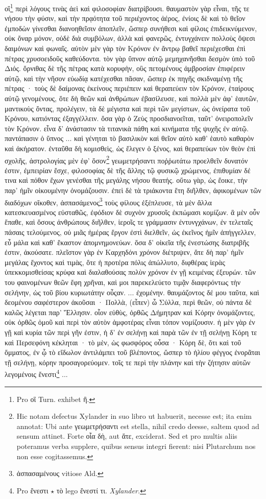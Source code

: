 \documentclass[a4paper, 11pt, oneside, polutonikogreek, german]{article}
\begin{document}
οἳ\footnote{Pro οἳ Turn. exhibet ἢ.} περὶ λόγους τινὰς ἀεὶ καὶ φιλοσοφίαν διατρίβουσι. θαυμαστὸν γὰρ εἶναι, τῆς τε νήσου τὴν φύσιν, καὶ τὴν πρᾳότητα τοῦ περιέχοντος ἀέρος, ἐνίοις δὲ καὶ τὸ θεῖον ἐμποδὼν γίνεσθαι διανοηθεῖσιν ἀποπλεῖν, ὥσπερ συνήθεσι καὶ φίλοις ἐπιδεικνύμενον, οὐκ ὄναρ μόνον, οὐδὲ διὰ συμβόλων, ἀλλὰ καὶ φανερῶς, ἐντυγχάνειν πολλοὺς ὄψεσι δαιμόνων καὶ φωναῖς. αὐτὸν μὲν γὰρ τὸν Κρόνον ἐν ἄντρῳ βαθεῖ περιέχεσθαι ἐπὶ πέτρας χρυσοειδοῦς καθεύδοντα. τὸν γὰρ ὕπνον αὐτῷ μεμηχανῆσθαι δεσμὸν ὑπὸ τοῦ Διός. ὄρνιθας δὲ τῆς πέτρας κατὰ κορυφὴν, οὓς πετομένους ἀμβροσίαν ἐπιφέρειν αὐτῷ, καὶ τὴν νῆσον εὐωδίᾳ κατέχεσθαι πᾶσαν, ὥσπερ ἐκ πηγῆς σκιδναμένῃ τῆς πέτρας · τοὺς δὲ δαίμονας ἐκείνους περιέπειν καὶ θεραπεύειν τὸν Κρόνον, ἑταίρους αὐτῷ γενομένους, ὅτε δὴ θεῶν καὶ ἀνθρώπων ἐβασίλευσε, καὶ πολλὰ μὲν ἀφ' ἑαυτῶν, μαντικοὺς ὄντας, προλέγειν, τὰ δὲ μέγιστα καὶ περὶ τῶν μεγίστων, ὡς ὀνείρατα τοῦ Κρόνου, κατιόντας ἐξαγγέλλειν. ὅσα γὰρ ὁ Ζεὺς προσδιανοεῖται, ταῦτ' ὀνειροπολεῖν τὸν Κρόνον. εἶνα δ' ἀνάστασιν τὰ τιτανικὰ πάθη καὶ κινήματα τῆς ψυχῆς ἐν αὐτῷ. παντάπασιν ὁ ὕπνος ... καὶ γένηται τὸ βασιλικὸν καὶ θεῖον αὐτὸ καθ' ἑαυτὸ καθαρὸν καὶ ἀκήρατον. ἐνταῦθα δὴ κομισθεὶς, ὡς ἔλεγεν ὁ ξένος, καὶ θεραπεύων τὸν θεὸν ἐπὶ σχολῆς, ἀστρολογίας μὲν ἐφ' ὅσον\footnote{Hic notam defectus Xylander in suo libro ut habuerit, necesse est; ita enim annotat: Ubi ante γεωμετρήσαντι est stella, nihil credo deesse, saltem quod ad sensum attinet. Forte οἷα δὴ, aut ἅτε, exciderat. Sed et pro multis aliis poteramus verba supplere, quibus sensus integri fierent: nisi Plutarchum nos non esse cogitassemus.} γεωμετρήσαντι ποῤῥωτάτω προελθεῖν δυνατόν ἐστιν, ἐμπειρίαν ἔσχε, φιλοσοφίας δὲ τῆς ἄλλης τῷ φυσικῷ χρώμενος, ἐπιθυμίαν δέ τινα καὶ πόθον ἔχων γενέσθαι τῆς μεγάλης νήσου θεατής. οὕτω γὰρ, ὡς ἔοικε, τὴν παρ' ἡμῖν οἰκουμένην ὀνομάζουσιν. ἐπεὶ δὲ τὰ τριάκοντα ἔτη διῆλθεν, ἀφικομένων τῶν διαδόχων οἴκοθεν, ἀσπασάμενος\footnote{ἀσπασαμένους vitiose Ald.} τοὺς φίλους ἐξέπλευσε, τὰ μὲν ἄλλα κατεσκευασμένος εὐσταθῶς, ἐφόδιον δὲ συχνὸν χρυσοῖς ἐκπώμασι κομίζων. ἃ μὲν οὖν ἔπαθε, καὶ ὅσους ἀνθρώπους διῆλθεν, ἱεροῖς τε γράμμασιν ἐντυνγχάνων, ἐν τελεταῖς πάσαις τελούμενος, οὐ μιᾶς ἡμέρας ἔργον ἐστὶ διελθεῖν, ὡς ἐκεῖνος ἡμῖν ἀπήγγελλεν, εὖ μάλα καὶ καθ' ἕκαστον ἀπομνημονεύων. ὅσα δ' οἰκεῖα τῆς ἐνεστώσης διατριβῆς ἐστιν, ἀκούσατε. πλεῖστον γὰρ ἐν Καρχηδόνι χρόνον διέτριψεν, ἅτε δὴ παρ' ἡμῖν μεγάλας ἔχοντος καὶ τιμὰς, ὅτε ἡ προτέρα πόλις ἀπώλλυτο, διφθέρας ἱερὰς ὑπεκκομισθείσας κρύφα καὶ διαλαθούσας πολὺν χρόνον ἐν γῇ κειμένας ἐξευρών. τῶν του φαινομένων θεῶν ἔφη χρῆναι, καὶ μοι παρεκελεύετο τιμᾷν διαφερόντως τὴν σελήνην, ὡς τοῦ βίου κυριωτάτην οὖςαν. ... ἐχομένην. θαυμάζοντος δέ μου ταῦτα, καὶ δεομένου σαφέστερον ἀκοῦσαι · Πολλὰ, (εἶπεν) ὦ Σύλλα, περὶ θεῶν, οὐ πάντα δὲ καλῶς λέγεται παρ' Ἕλλησιν. οἷον εὐθὺς, ὀρθῶς Δήμητραν καὶ Κόρην ὀνομάζοντες, οὐκ ὀρθῶς ὁμοῦ καὶ περὶ τὸν αὐτὸν ἀμφοτέρας εἶναι τόπον νομίζουσιν. ἡ μὲν γὰρ ἐν γῇ καὶ κυρία τῶν περὶ γῆν ἐστιν, ἡ δ' ἐν σελήνῃ καὶ παρὰ τῶν ἐν τῇ σελήνῃ Κόρη τε καὶ Περσεφόνη κέκληται · τὸ μὲν, ὡς φωσφόρος οὖσα · Κόρη δὲ, ὅτι καὶ τοῦ ὄμματος, ἐν ᾧ τὸ εἴδωλον ἀντιλάμπει τοῦ βλέποντος, ὥσπερ τὸ ἡλίου φέγγος ἐνορᾶται τῇ σελήνῃ, κόρην προσαγορεύομεν. τοῖς τε περὶ τὴν πλάνην καὶ τὴν ζήτησιν αὐτῶν λεγομένοις ἔνεστι\footnote{Pro ἔνεστι $\star$ τὸ lego ἔνεστί τι. \emph{Xylander.}} ... 
\end{document}
